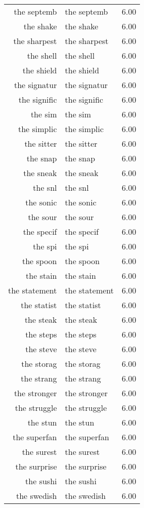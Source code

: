 \begin{table}[ht]
\begin{tabular}{rlr}
  the septemb & the septemb & 6.00 \\ 
  the shake & the shake & 6.00 \\ 
  the sharpest & the sharpest & 6.00 \\ 
  the shell & the shell & 6.00 \\ 
  the shield & the shield & 6.00 \\ 
  the signatur & the signatur & 6.00 \\ 
  the signific & the signific & 6.00 \\ 
  the sim & the sim & 6.00 \\ 
  the simplic & the simplic & 6.00 \\ 
  the sitter & the sitter & 6.00 \\ 
  the snap & the snap & 6.00 \\ 
  the sneak & the sneak & 6.00 \\ 
  the snl & the snl & 6.00 \\ 
  the sonic & the sonic & 6.00 \\ 
  the sour & the sour & 6.00 \\ 
  the specif & the specif & 6.00 \\ 
  the spi & the spi & 6.00 \\ 
  the spoon & the spoon & 6.00 \\ 
  the stain & the stain & 6.00 \\ 
  the statement & the statement & 6.00 \\ 
  the statist & the statist & 6.00 \\ 
  the steak & the steak & 6.00 \\ 
  the steps & the steps & 6.00 \\ 
  the steve & the steve & 6.00 \\ 
  the storag & the storag & 6.00 \\ 
  the strang & the strang & 6.00 \\ 
  the stronger & the stronger & 6.00 \\ 
  the struggle & the struggle & 6.00 \\ 
  the stun & the stun & 6.00 \\ 
  the superfan & the superfan & 6.00 \\ 
  the surest & the surest & 6.00 \\ 
  the surprise & the surprise & 6.00 \\ 
  the sushi & the sushi & 6.00 \\ 
  the swedish & the swedish & 6.00 \\ 

\end{tabular}
\end{table}
